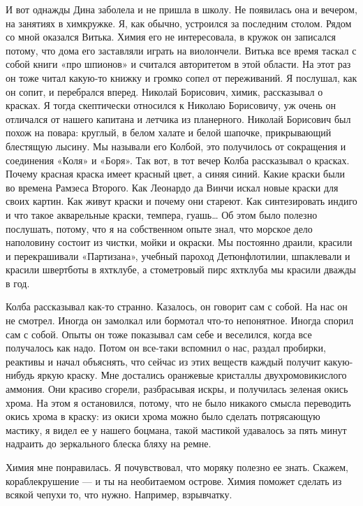 И вот  однажды Дина  заболела и  не пришла  в школу.  Не появилась  она  и
вечером, на занятиях  в химкружке.  Я, как обычно,  устроился за  последним
столом. Рядом со мной оказался Витька. Химия его не интересовала, в кружок
он записался потому, что дома его заставляли играть на виолончели.  Витька
все время таскал с собой книги «про шпионов» и считался авторитетом в  этой
области. На  этот раз  он тоже  читал какую-то  книжку и  громко сопел  от
переживаний. Я  послушал,  как  он сопит,  и  перебрался  вперед.  Николай
Борисович, химик, рассказывал  о красках. Я  тогда скептически относился  к
Николаю Борисовичу, уж очень он отличался от нашего капитана и летчика  из
планерного. Николай Борисович был похож на повара: круглый, в белом халате
и белой шапочке,  прикрывающий блестящую лысину.  Мы называли его  Колбой,
это получилось от сокращения и соединения «Коля» и «Боря». Так вот, в  тот
вечер Колба рассказывал  о красках.  Почему красная  краска имеет  красный
цвет, а синяя  синий. Какие краски  были во времена  Рамзеса Второго.  Как
Леонардо да Винчи искал новые краски для своих картин. Как живут краски  и
почему они  стареют.  Как синтезировать  индиго  и что  такое  акварельные
краски, темпера, гуашь… Об этом было  полезно послушать, потому, что я  на
собственном опыте знал,  что морское  дело наполовину  состоит из  чистки,
мойки и окраски. Мы постоянно драили, красили и перекрашивали «Партизана»,
учебный пароход Детюнфлотилии, шпаклевали и красили швертботы в  яхтклубе,
а стометровый пирс яхтклуба мы красили дважды в год.

Колба рассказывал как-то странно. Казалось, он говорит сам с собой. На нас
он не смотрел. Иногда он  замолкал или бормотал что-то непонятное.  Иногда
спорил сам с собой.  Опыты он тоже показывал  сам себе и веселился,  когда
все получалось  как  надо.  Потом  он  все-таки  вспомнил  о  нас,  раздал
пробирки, реактивы и начал  объяснять, что сейчас  из этих веществ  каждый
получит какую-нибудь  яркую  краску.  Мне  достались  оранжевые  кристаллы
двухромовикислого аммония.  Они  красиво  сгорели,  разбрасывая  искры,  и
получилась зеленая окись хрома. На этом я остановился, потому, что не было
никакого смысла переводить окись хрома в краску: из окиси хрома можно было
сделать потрясающую мастику, я видел  ее у нашего боцмана, такой  мастикой
удавалось за пять минут надраить до зеркального блеска бляху на ремне.

Химия мне  понравилась.  Я  почувствовал, что  моряку  полезно  ее  знать.
Скажем, кораблекрушение  —  и ты  на  необитаемом острове.  Химия  поможет
сделать из всякой чепухи то, что нужно. Например, взрывчатку.

